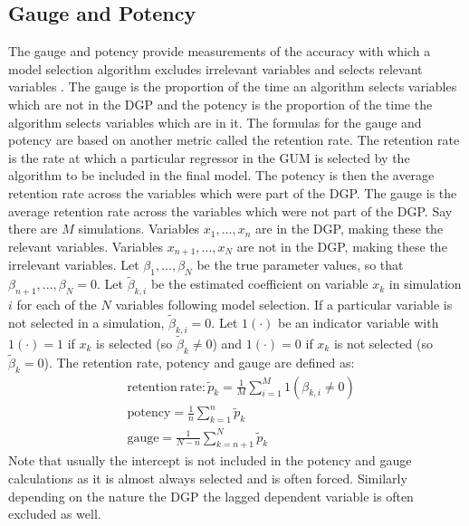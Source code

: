 \subsection{Gauge and Potency}
The gauge and potency provide measurements of the accuracy with which a model selection algorithm excludes irrelevant variables and selects relevant variables \cite{evalmodelsel}. The gauge is the proportion of the time an algorithm selects variables which are not in the DGP and the potency is the proportion of the time the algorithm selects variables which are in it. The formulas for the gauge and potency are based on another metric called the retention rate. The retention rate is the rate at which a particular regressor in the GUM is selected by the algorithm to be included in the final model. The potency is then the average retention rate across the variables which were part of the DGP. The gauge is the average retention rate across the variables which were not part of the DGP. Say there are $M$ simulations. Variables $x_{1},...,x_{n}$ are in the DGP, making these the relevant variables. Variables $x_{n+1},...,x_{N}$ are not in the DGP, making these the irrelevant variables. Let $\beta_{1},...,\beta_{N}$ be the true parameter values, so that $\beta_{n+1},...,\beta_{N}=0$. Let $\widetilde\beta_{k,i}$ be the estimated coefficient on variable $x_{k}$ in simulation $i$  for each of the $N$ variables following model selection. If a particular variable is not selected in a simulation, $\widetilde\beta_{k,i}=0$. Let $1(\cdot)$ be an indicator variable with $1(\cdot)=1$ if $x_{k}$ is selected (so $\widetilde\beta_{k}\neq 0$) and $1(\cdot) = 0$ if $x_{k}$ is not selected (so $\widetilde\beta_{k}=0$). The retention rate, potency and gauge are defined as: 
\begin{align*}
&\mathrm{retention\ rate}:   \widetilde p_{k} = \frac{1}{M} \sum_{i=1}^{M}1(\beta_{k,i} \neq 0)\\
&\mathrm{potency} = \frac{1}{n} \sum_{k=1}^{n} \widetilde p_{k}\\
&\mathrm{gauge} = \frac{1}{N-n} \sum_{k=n+1}^{N} \widetilde p_{k}
\end{align*}
Note that usually the intercept is not included in the potency and gauge calculations as it is almost always selected and is often forced. Similarly depending on the nature the DGP the lagged dependent variable is often excluded as well. 








